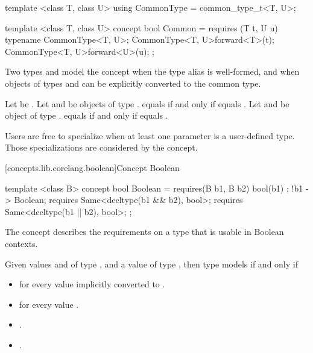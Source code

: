 \begin{addedblock}
%
\begin{itemdecl}
template <class T, class U>
using CommonType = common_type_t<T, U>;

template <class T, class U>
concept bool Common =
  requires (T t, U u) {
    typename CommonType<T, U>;
    {CommonType<T, U>{forward<T>(t)}};
    {CommonType<T, U>{forward<U>(u)}};
  };
\end{itemdecl}

\begin{itemdescr}
\pnum
Two types  and  model the  concept when the type
alias  is well-formed, and when objects of types 
and  can be explicitly converted to the common type.

\pnum
Let  be . Let  and  be objects
of type .  equals  if and only if  equals
. Let  and  be object of type . 
equals  if and only if  equals .

\pnum
\enternote Users are free to specialize  when at least one parameter is a
user-defined type. Those specializations are considered by the  concept.\exitnote

\end{itemdescr}

[concepts.lib.corelang.boolean]{Concept Boolean}

%
\begin{itemdecl}
template <class B>
concept bool Boolean =
  requires(B b1, B b2) {
    { bool(b1) };
    { !b1 } -> Boolean;
    requires Same<decltype(b1 && b2), bool>;
    requires Same<decltype(b1 || b2), bool>;
  };
\end{itemdecl}

\pnum
The  concept describes the requirements on a type that is
usable in Boolean contexts.

\pnum
Given values  and  of type , and a value  of
type , then type  models  if and only if

\begin{itemize}
\item {} for every value  implicitly converted to
      .
\item {} for every value .
\item {}.
\item {}.
\end{itemize}


\end{addedblock}

